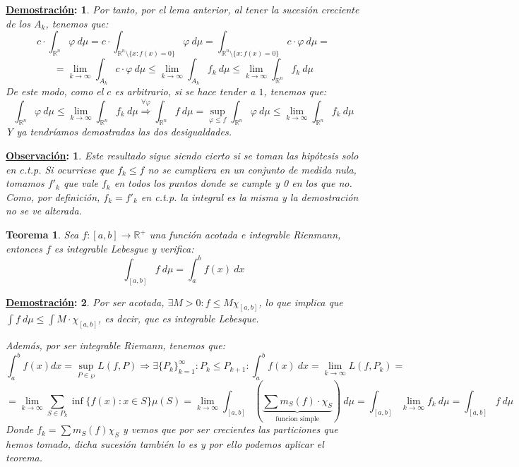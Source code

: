 \documentclass[10pt,a4paper,openright]{book}
\theoremstyle{break}
\newtheorem*{theo}{Teorema}
\newtheorem*{demo}{\underline{Demostración}:}
\newtheorem*{obs}{\underline{Observación}:}
\begin{document}
\begin{demo}
Por tanto, por el lema anterior, al tener la sucesión creciente de los $A_k$, tenemos que:
$$c \cdot \int_{\mathbb{R}^n}\varphi \ d \mu = c\cdot \int_{\mathbb{R}^n \setminus \{x : f\left(x\right) = 0\}}\varphi \ d \mu = \int_{\mathbb{R}^n \setminus \{x : f\left(x\right) = 0\}} c  \cdot \varphi \ d \mu = $$
$$=\lim_{k\rightarrow\infty} \int_{A_k} c \cdot \varphi \ d \mu \le \lim_{k\rightarrow\infty} \int_{A_k} f_k \ d \mu \le \lim_{k\rightarrow\infty} \int_{\mathbb{R}^n} f_k \ d \mu$$
De este modo, como el $c$ es arbitrario, si se hace tender a $1$, tenemos que:
$$\int_{\mathbb{R}^n} \varphi \ d \mu \le \lim_{k\rightarrow\infty} \int_{\mathbb{R}^n} f_k \ d \mu \stackrel{\forall \varphi}{\Rightarrow} \int_{\mathbb{R}^n}f \ d \mu = \sup_{\varphi \le f} \int_{\mathbb{R}^n}\varphi \ d \mu \le \lim_{k\rightarrow\infty} \int_{\mathbb{R}^n}f_k \ d \mu$$
Y ya tendríamos demostradas las dos desigualdades.
\end{demo}

\begin{obs}
Este resultado sigue siendo cierto si se toman las hipótesis solo en c.t.p. Si ocurriese que $f_k \leq f$ no se cumpliera en un conjunto de medida nula, tomamos $f'_k$ que vale $f_k$ en todos los puntos donde se cumple y 0 en los que no. Como, por definición, $f_k = f'_k$ en c.t.p. la integral es la misma y la demostración no se ve alterada.
\end{obs}

\begin{theo}
Sea $f: \left[a, b\right] \rightarrow \mathbb{R}^+$ una función acotada e integrable Rienmann, entonces $f$ es integrable Lebesgue y verifica:
$$\int_{\left[a, b\right]}f \ d \mu = \int_a^b f\left(x\right)\ dx$$
\end{theo}
\begin{demo}
Por ser acotada, $\exists M > 0: f \le M\chi_{\left[a, b\right]}$, lo que implica que $\int f \ d \mu \leq \int M \cdot \chi_{[a,b]}$, es decir, que es integrable Lebesque.

Además, por ser integrable Riemann, tenemos que:
$$\int_a^b f\left(x\right)dx = \sup_{P \in \wp} L\left(f, P\right) \Rightarrow \exists \{P_k\}_{k=1}^{\infty} : P_k \leq P_{k+1} : \int_a^b f\left(x\right) \ dx = \lim_{k\rightarrow \infty} L\left(f, P_k\right) = $$
$$= \lim_{k\rightarrow\infty} \sum_{S \in P_k} \inf \{f\left(x\right) : x \in S\}\mu\left(S\right) = \lim_{k\rightarrow\infty} \int_{\left[a, b\right]}\left(\underbrace{\sum m_S \left(f\right) \cdot \chi_S}_{\text{funcion simple}}\right) \ d \mu = \int_{\left[a, b\right]}\lim_{k\rightarrow\infty} f_k \ d \mu = \int_{\left[a, b\right]}f \ d \mu$$
Donde $f_k = \sum m_S\left(f\right) \chi_S$ y vemos que por ser crecientes las particiones que hemos tomado, dicha sucesión también lo es y por ello podemos aplicar el teorema.
\end{demo}
\end{document}
